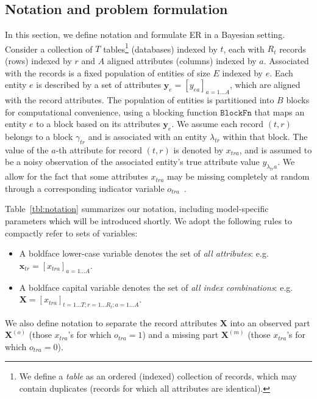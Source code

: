 \documentclass[12pt,letterpaper]{article}
\renewcommand\vec{\bm}
\newcommand{\blockfn}{\mathtt{BlockFn}} %
\newcommand{\1}[1]{\mathbb{I}\!\left[#1\right]} %
\begin{document}
\subsection{Notation and problem formulation}
\label{sec:problem}
In this section, we define notation and formulate ER in a Bayesian 
setting.
Consider a collection of $T$ tables\footnote{We define a \emph{table} 
as an ordered (indexed) collection of records, which may contain
duplicates (records for which all attributes are identical).} 
(databases) indexed by $t$, each with $R_t$ records (rows) indexed by $r$
and $A$ aligned attributes (columns) indexed by $a$.
Associated with the records is a fixed population of entities of size $E$ 
indexed by $e$. 
Each entity $e$ is described by a set of attributes 
$\vec{y}_e = [y_{ea}]_{a = 1 \ldots A}$, which are aligned with the 
record attributes. 
The population of entities is partitioned into $B$ blocks for 
computational convenience, using a blocking function $\blockfn$ that maps an 
entity $e$ to a block based on its attributes $\vec{y}_e$.
We assume each record $(t,r)$ belongs to a block $\gamma_{tr}$ and 
is associated with an entity $\lambda_{tr}$ within that block.
The value of the $a$-th attribute for record $(t,r)$ is 
denoted by $x_{tra}$, and is assumed to be a noisy observation 
of the associated entity's true attribute value $y_{\lambda_{tr}a}$.
We allow for the fact that some attributes $x_{tra}$ may be missing
completely at random through a corresponding indicator variable 
$o_{tra}$~\cite[p.~12]{little_statistical_2002}.

Table~\ref{tbl:notation} summarizes our notation, including 
model-specific parameters which will be introduced shortly.
We adopt the following rules to compactly refer to sets of variables:
\begin{itemize}
  \item A boldface lower-case variable denotes the set of 
  \emph{all attributes}: e.g.~$\vec{x}_{tr} = [x_{tra}]_{a=1\ldots A}$.
  \item A boldface capital variable denotes the set of 
  \emph{all index combinations}: 
  e.g.~$\vec{X} = [x_{tra}]_{t=1\ldots T; r=1 \ldots R_t; a=1 \ldots A}$.
\end{itemize}
We also define notation to separate the record attributes $\mathbf{X}$ 
into an observed part $\mathbf{X}^{(o)}$ (those $x_{tra}$'s for which 
$o_{tra} = 1$) and a missing part $\mathbf{X}^{(m)}$ (those 
$x_{tra}$'s for which $o_{tra}=0$).
\end{document}
